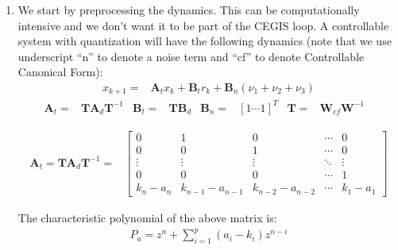 \documentclass[runningheads,a4paper]{llncs}
\newcommand{\mat}[1]{\boldsymbol{#1}}
\begin{document}
\begin{enumerate}
\item 
We start by preprocessing the dynamics. This can be computationally intensive and we don't want it to be part of the CEGIS loop.
A controllable system with quantization will have the following dynamics 
(note that we use underscript ``n'' to denote a noise term and
``cf'' to denote Controllable Canonical Form):
%
\begin{align}
\label{eq:observer_LTI_cf}
x_{k+1}=&\mat{A}_{t}x_k+\mat{B}_{t} r_k+\mat{B}_{n} (\nu_1 + \nu_2 + \nu_3)
\end{align}
\begin{align*}
\mat{A}_{t}=&\mat{T}\mat{A}_d\mat{T}^{-1}&
\mat{B}_{t}=&\mat{T}\mat{B}_d&
\mat{B}_{n}=&[1 \cdots 1]^T&
\mat{T}=&\mat{W}_{cf}\mat{W}^{-1}&
\end{align*}

\begin{align*}
\mat{A}_{t}=\mat{T}\mat{A}_d\mat{T}^{-1}=&\left[
\begin{array}{ccccc}
0&1&0&\cdots&0\\
0&0&1&\cdots&0\\
\vdots&\vdots&\vdots&\ddots&\vdots\\
0&0&0&\cdots&1\\
k_n-a_n&k_{n-1}-a_{n-1}&k_{n-2}-a_{n-2}&\cdots&k_1-a_1
\end{array}\right]
\label{eq:cf_SISO_2}
\end{align*}

The characteristic polynomial of the above matrix is:
%
\begin{align*}
P_a = z^n+\sum_{i=1}^p{(a_i-k_i)z^{n-i}}
\end{align*}


\end{enumerate}
\end{document}

